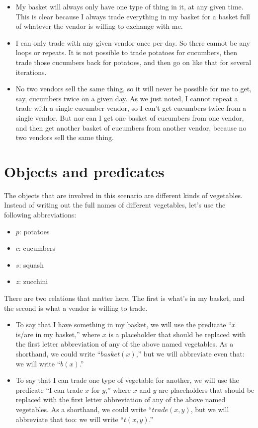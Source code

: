 \documentclass[../../../main.tex]{subfiles}
\begin{document}
\begin{itemize}
  \item{My basket will always only have one type of thing in it, at any given time. This is clear because I always trade everything in my basket for a basket full of whatever the vendor is willing to exchange with me.}
  \item{I can only trade with any given vendor once per day. So there cannot be any loops or repeats. It is not possible to trade potatoes for cucumbers, then trade those cucumbers back for potatoes, and then go on like that for several iterations.}
    \item{No two vendors sell the same thing, so it will never be possible for me to get, say, cucumbers twice on a given day. As we just noted, I cannot repeat a trade with a single cucumber vendor, so I can't get cucumbers twice from a single vendor. But nor can I get one basket of cucumbers from one vendor, and then get another basket of cucumbers from another vendor, because no two vendors sell the same thing.}
\end{itemize}


\section{Objects and predicates}

The objects that are involved in this scenario are different kinds of vegetables. Instead of writing out the full names of different vegetables, let's use the following abbreviations:

\begin{itemize}
  \item{$p$: potatoes}
  \item{$c$: cucumbers}
  \item{$s$: squash}
  \item{$z$: zucchini} 
\end{itemize}

\noindent
There are two relations that matter here. The first is what's in my basket, and the second is what a vendor is willing to trade. 

\begin{itemize}
  \item{To say that I have something in my basket, we will use the predicate ``$x$ is/are in my basket,'' where $x$ is a placeholder that should be replaced with the first letter abbreviation of any of the above named vegetables. As a shorthand, we could write ``$basket(x)$,'' but we will abbreviate even that: we will write ``$b(x)$.''}
  \item{To say that I can trade one type of vegetable for another, we will use the predicate ``I can trade $x$ for $y$,'' where $x$ and $y$ are placeholders that should be replaced with the first letter abbreviation of any of the above named vegetables. As a shorthand, we could write ``$trade(x, y)$, but we will abbreviate that too: we will write ``$t(x, y)$.''}
\end{itemize}
\end{document}
